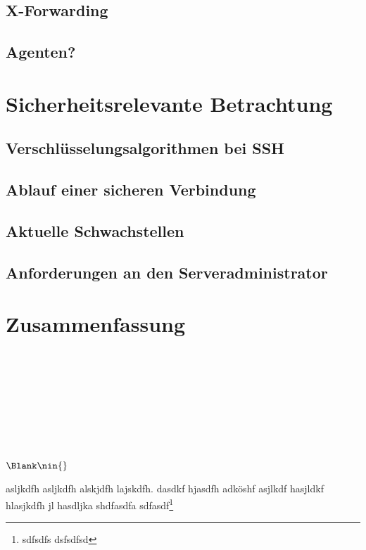\documentclass[ngerman,pdf]{wkcms}    %
\begin{document}
\subsection{X-Forwarding}
\subsection{Agenten?}


\section{Sicherheitsrelevante Betrachtung}
\subsection{Verschlüsselungsalgorithmen bei SSH}
\subsection{Ablauf einer sicheren Verbindung}
\subsection{Aktuelle Schwachstellen}
\subsection{Anforderungen an den Serveradministrator}


\newpage


\section{Zusammenfassung}

\bzgl \bzw \ca \Dh \evtl \etc \ggf \iAllg \oAe \uAe \usf \usw \vgl \zB \\
\cf \cp \ie \eg \etc \wrt \viz \vs \Wlog \\
 \\
  \\
 \\
 \\
  \\
 \\
 $\Blank \nin \{\}$


asljkdfh asljkdfh alskjdfh lajskdfh. dasdkf hjasdfh adköshf asjlkdf
hasjldkf hlasjkdfh jl hasdljka shdfasdfa sdfasdf\footnote{sdfsdfs dsfsdfsd}



\end{document}

